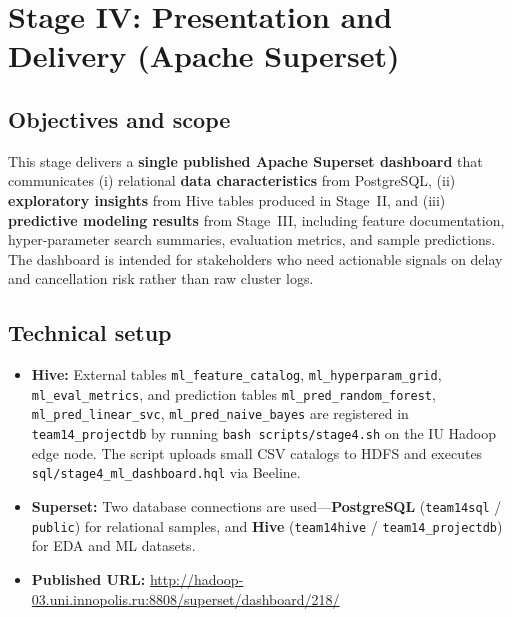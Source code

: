 
\section{Stage IV: Presentation and Delivery (Apache Superset)}

\subsection{Objectives and scope}
This stage delivers a \textbf{single published Apache Superset dashboard} that communicates (i) relational \textbf{data characteristics} from PostgreSQL, (ii) \textbf{exploratory insights} from Hive tables produced in Stage~II, and (iii) \textbf{predictive modeling results} from Stage~III, including feature documentation, hyper-parameter search summaries, evaluation metrics, and sample predictions. The dashboard is intended for stakeholders who need actionable signals on delay and cancellation risk rather than raw cluster logs.

\subsection{Technical setup}
\begin{itemize}
  \item \textbf{Hive:} External tables \texttt{ml\_feature\_catalog}, \texttt{ml\_hyperparam\_grid}, \texttt{ml\_eval\_metrics}, and prediction tables \texttt{ml\_pred\_random\_forest}, \texttt{ml\_pred\_linear\_svc}, \texttt{ml\_pred\_naive\_bayes} are registered in \texttt{team14\_projectdb} by running \texttt{bash scripts/stage4.sh} on the IU Hadoop edge node. The script uploads small CSV catalogs to HDFS and executes \texttt{sql/stage4\_ml\_dashboard.hql} via Beeline.
  \item \textbf{Superset:} Two database connections are used---\textbf{PostgreSQL} (\texttt{team14sql} / \texttt{public}) for relational samples, and \textbf{Hive} (\texttt{team14hive} / \texttt{team14\_projectdb}) for EDA and ML datasets.
  \item \textbf{Published URL:} \url{http://hadoop-03.uni.innopolis.ru:8808/superset/dashboard/218/}
\end{itemize}

